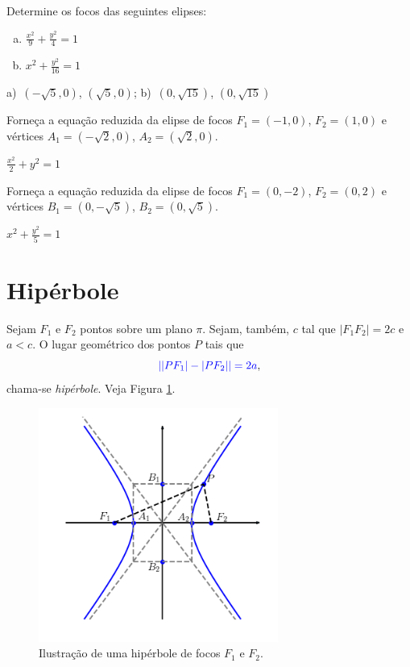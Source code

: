\begin{exer}
  Determine os focos das seguintes elipses:
  \begin{enumerate}[a)]
  \item $\displaystyle \frac{x^2}{9} + \frac{y^2}{4} = 1$
  \item $\displaystyle x^2 + \frac{y^2}{16} = 1$
  \end{enumerate}
\end{exer}
\begin{resp}
  a)~$(-\sqrt{5}, 0)$, $(\sqrt{5}, 0)$; b)~$(0, \sqrt{15})$, $(0, \sqrt{15})$
\end{resp}

\begin{exer}
  Forneça a equação reduzida da elipse de focos $F_1=(-1, 0)$, $F_2=(1, 0)$ e vértices $A_1=(-\sqrt{2}, 0)$, $A_2=(\sqrt{2}, 0)$.
\end{exer}
\begin{resp}
  $\displaystyle\frac{x^2}{2}+y^2=1$
\end{resp}

\begin{exer}
  Forneça a equação reduzida da elipse de focos $F_1=(0, -2)$, $F_2=(0, 2)$ e vértices $B_1=(0, -\sqrt{5})$, $B_2=(0, \sqrt{5})$.
\end{exer}
\begin{resp}
  $\displaystyle x^2+\frac{y^2}{5}=1$
\end{resp}

\section{Hipérbole}\label{cap_conicas_sec_hiperbole}

Sejam $F_1$ e $F_2$ pontos sobre um plano $\pi$. Sejam, também, $c$ tal que $|F_1F_2|=2c$ e $a<c$. O lugar geométrico dos pontos $P$ tais que
\begin{equation}
  {\color{blue}||PF_1|-|PF_2||=2a},
\end{equation}
chama-se \emph{hipérbole}. Veja Figura \ref{fig:hiperbole}.

\begin{figure}[H]
  \centering
  \includegraphics[width=0.7\textwidth]{./cap_conicas/dados/fig_hiperbole/fig_hiperbole}
  \caption{Ilustração de uma hipérbole de focos $F_1$ e $F_2$.}
  \label{fig:hiperbole}
\end{figure}

